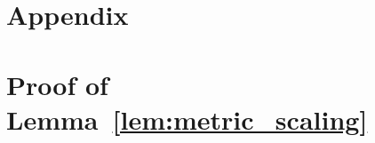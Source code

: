 \documentclass{article}
\begin{document}
    



\newpage
\appendix
\section*{Appendix}

\section{Proof of Lemma~\ref{lem:metric_scaling}} \label{ssec:proof_of_metric_scaling_lemma}
\end{document}
